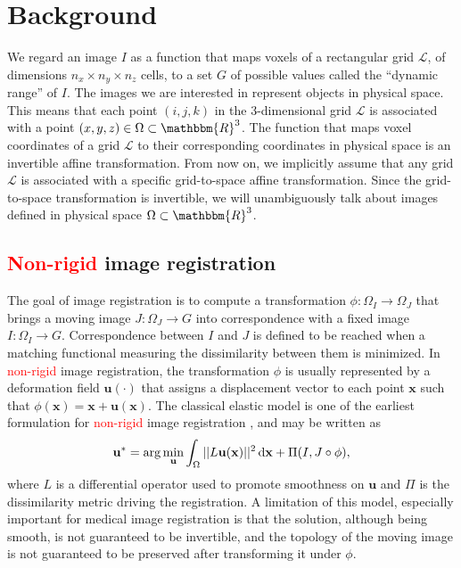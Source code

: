 \section{Background}
We regard an image $I$ as a function that maps voxels of a rectangular grid \hbox{$\mathcal{L}$}, of dimensions $n_{x} \times n_{y} \times n_{z}$ cells, to a set $G$ of
possible values called the ``dynamic range'' of $I$. The images we are interested in represent objects in physical space. This means that each point $(i,j,k)$ in the
3-dimensional grid $\mathcal{L}$ is associated with a point $(x,y,z) \in \Omega \subset \mathbbm{R}^{3}$. The function that maps voxel coordinates of a grid $\mathcal{L}$ to their corresponding coordinates in physical space is an invertible affine transformation. From now on, we implicitly assume that any grid $\mathcal{L}$ is associated with a specific grid-to-space affine transformation. Since the grid-to-space transformation is invertible, we will unambiguously talk about images defined in physical space $\Omega \subset \mathbbm{R}^{3}$.\\

\vspace{-0.5cm}
\subsection{\textcolor{red}{Non-rigid} image registration}\label{sec:non_linear_image_registration}
The goal of image registration is to compute a transformation $\phi: \Omega_{I} \rightarrow \Omega_{J}$ that brings a moving image $J:\Omega_{J} \rightarrow G$ into correspondence
with a fixed image $I:\Omega_{I} \rightarrow G$. Correspondence between $I$ and $J$ is defined to be reached when a matching functional measuring the dissimilarity between them is minimized. In \textcolor{red}{non-rigid} image registration, the transformation $\phi$ is usually represented by a deformation field $\mathbf{u(\cdot)}$ that assigns a displacement vector
to each point $\mathbf{x}$ such that $\phi(\mathbf{x}) = \mathbf{x} + \mathbf{u}(\mathbf{x})$. The classical elastic model is one of the earliest formulation for \textcolor{red}{non-rigid} image registration \cite{Bajcsy1982, Gee1999}, and may be written as
\begin{equation}\label{eq:elastic}
    \mathbf{u}^{*} = \arg \min_{\mathbf{u}} \int_{\Omega} ||L \mathbf{u}(\mathbf{x})||^{2}\dif\mathbf{x} + \Pi(I, J \circ \phi),
\end{equation}
where $L$ is a differential operator used to promote smoothness on $\mathbf{u}$ and $\Pi$ is the dissimilarity metric driving the registration. A limitation of this model, especially important for medical image registration is that the solution, although being smooth, is not guaranteed to be invertible, and the topology of the moving image is not guaranteed to be preserved after transforming it under $\phi$.\\

